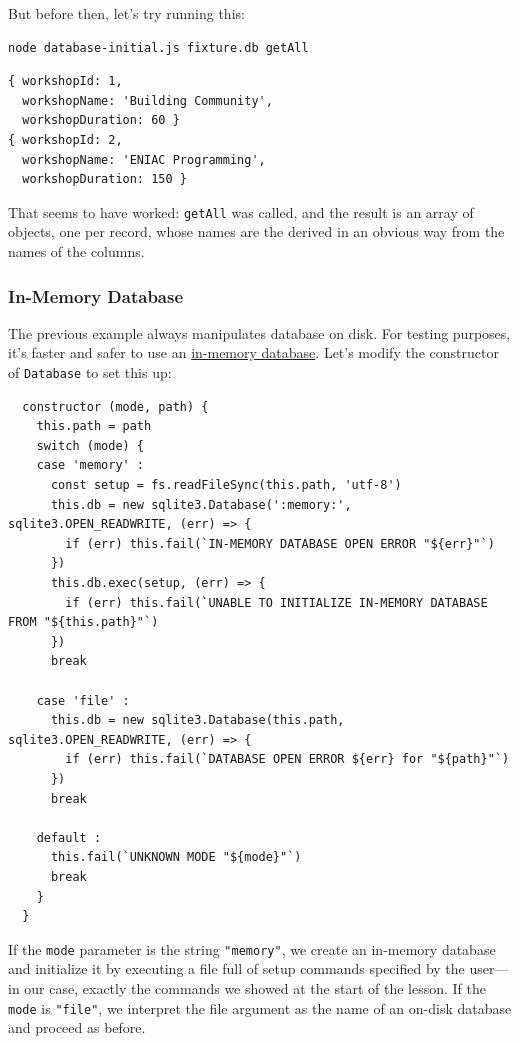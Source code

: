 But before then, let's try running this:

\begin{verbatim}
node database-initial.js fixture.db getAll
\end{verbatim}

\begin{verbatim}
{ workshopId: 1,
  workshopName: 'Building Community',
  workshopDuration: 60 }
{ workshopId: 2,
  workshopName: 'ENIAC Programming',
  workshopDuration: 150 }
\end{verbatim}

That seems to have worked: \texttt{getAll} was called, and the result is
an array of objects, one per record, whose names are the derived in an
obvious way from the names of the columns.

\subsubsection{In-Memory Database}\label{s:db-in-memory}

The previous example always manipulates database on disk. For testing
purposes, it's faster and safer to use an
\protect\hyperlink{g:in-memory-database}{in-memory database}. Let's
modify the constructor of \texttt{Database} to set this up:

\begin{verbatim}
  constructor (mode, path) {
    this.path = path
    switch (mode) {
    case 'memory' :
      const setup = fs.readFileSync(this.path, 'utf-8')
      this.db = new sqlite3.Database(':memory:', sqlite3.OPEN_READWRITE, (err) => {
        if (err) this.fail(`IN-MEMORY DATABASE OPEN ERROR "${err}"`)
      })
      this.db.exec(setup, (err) => {
        if (err) this.fail(`UNABLE TO INITIALIZE IN-MEMORY DATABASE FROM "${this.path}"`)
      })
      break

    case 'file' :
      this.db = new sqlite3.Database(this.path, sqlite3.OPEN_READWRITE, (err) => {
        if (err) this.fail(`DATABASE OPEN ERROR ${err} for "${path}"`)
      })
      break

    default :
      this.fail(`UNKNOWN MODE "${mode}"`)
      break
    }
  }
\end{verbatim}

If the \texttt{mode} parameter is the string \texttt{"memory"}, we
create an in-memory database and initialize it by executing a file full
of setup commands specified by the user---in our case, exactly the
commands we showed at the start of the lesson. If the \texttt{mode} is
\texttt{"file"}, we interpret the file argument as the name of an
on-disk database and proceed as before.

